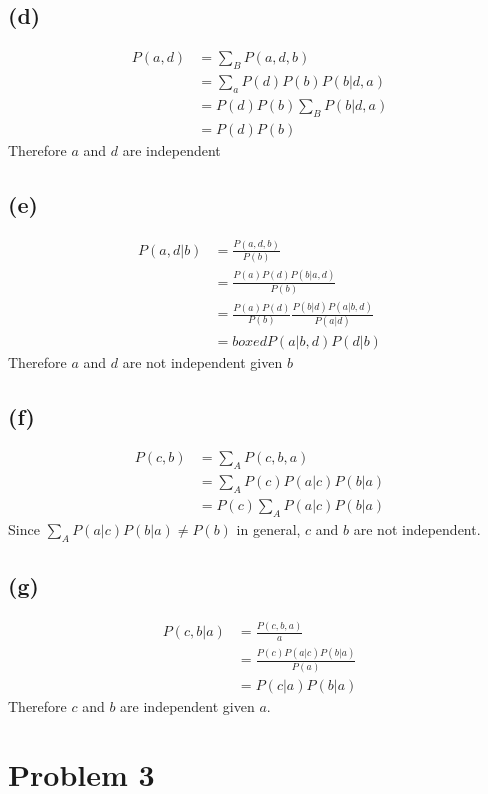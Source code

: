 \documentclass[12pt]{article}
\begin{document}
\subsection*{(d)}
\begin{align*}
   P(a,d)&= \sum_{B}P(a,d,b)\\
   &=\sum_{a}P(d)P(b)P(b|d,a)\\
   &=P(d)P(b)\sum_{B}P(b|d,a)\\
   &=P(d)P(b)
\end{align*}
Therefore $a$ and $d$ are independent
\subsection*{(e)}
\begin{align*}
    P(a,d|b)&= \frac{P(a,d,b)}{P(b)}\\
    &=\frac{P(a)P(d)P(b|a,d)}{P(b)}\\
    &=\frac{P(a)P(d)}{P(b)}\frac{P(b|d)P(a|b,d)}{P(a|d)}\\
    &=boxed{P(a|b,d)P(d|b)}
 \end{align*}
 Therefore $a$ and $d$ are not independent given $b$
 \subsection*{(f)}
 \begin{align*}
    P(c,b)&=  \sum_{A}P(c,b,a)\\
    &=\sum_{A}P(c)P(a|c)P(b|a)\\
    &=P(c)\sum_{A}P(a|c)P(b|a)
 \end{align*}
 Since $\sum_{A}P(a|c)P(b|a)\neq P(b)$ in general, $c$ and $b$ are not independent.
 \subsection*{(g)}
 \begin{align*}
    P(c,b|a)&=  \frac{P(c,b,a)}{a}\\
    &=\frac{P(c)P(a|c)P(b|a)}{P(a)}\\
    &=P(c|a)P(b|a)
 \end{align*}
 Therefore $c$ and $b$ are independent given $a$.
\section*{Problem 3}
\end{document}
